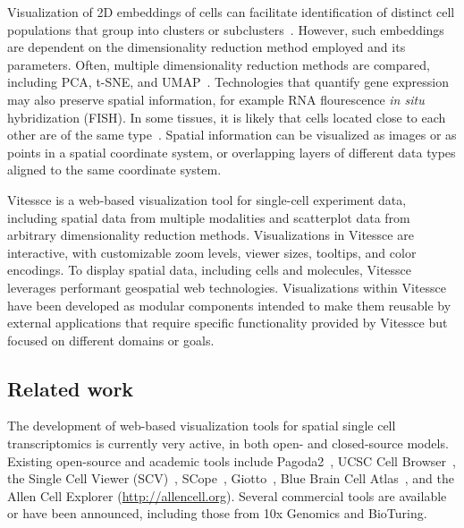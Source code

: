 \documentclass[12pt, letterpaper]{article}
\begin{document}
Visualization of 2D embeddings of cells can facilitate identification of distinct cell populations that group into clusters or subclusters~\cite{wang2017visualization,staahl2016visualization}.
However, such embeddings are dependent on the dimensionality reduction method employed and its parameters.
Often, multiple dimensionality reduction methods are compared, including PCA, t-SNE, and UMAP~\cite{ovchinnikova2019exploring,becht2019dimensionality}.
Technologies that quantify gene expression may also preserve spatial information, for example RNA flourescence \textit{in situ} hybridization (FISH).
In some tissues, it is likely that cells located close to each other are of the same type~\cite{stegle2015computational}.
Spatial information can be visualized as images or as points in a spatial coordinate system, or overlapping layers of different data types aligned to the same coordinate system.

Vitessce is a web-based visualization tool for single-cell experiment data, including spatial data from multiple modalities and scatterplot data from arbitrary dimensionality reduction methods.
Visualizations in Vitessce are interactive, with customizable zoom levels, viewer sizes, tooltips, and color encodings.
To display spatial data, including cells and molecules, Vitessce leverages performant geospatial web technologies.
Visualizations within Vitessce have been developed as modular components intended to make them reusable by external applications that require specific functionality provided by Vitessce but focused on different domains or goals.

\subsection{Related work}
The development of web-based visualization tools for spatial single cell transcriptomics is currently very active, in both open- and closed-source models.
Existing open-source and academic tools include Pagoda2~\cite{lake2018integrative}, UCSC Cell Browser~\cite{nowakowski2017spatiotemporal}, the Single Cell Viewer (SCV)~\cite{wang2019single}, SCope~\cite{wouters2019single}, Giotto~\cite{dries2019giotto}, Blue Brain Cell Atlas~\cite{ero2019cell}, and the Allen Cell Explorer (\url{http://allencell.org}).
Several commercial tools are available or have been announced, including those from 10x Genomics and BioTuring.

\end{document}
